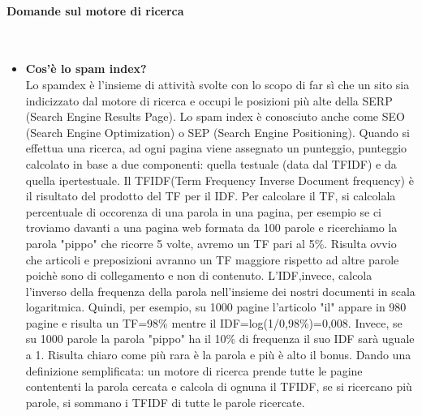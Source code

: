 \documentclass[10pt,                    %
               a4paper,                 %
               twoside,                 %
               openright,               %
               english,                 
               italian,                 
]{article}
\begin{document}
\paragraph{Domande sul motore di ricerca} \mbox{}\\
\begin{itemize}
\item \textbf{Cos'è lo spam index?} \\
Lo spamdex è l'insieme di attività svolte con lo scopo di far sì che un
sito sia indicizzato dal motore di ricerca e occupi le posizioni più alte 
della SERP (Search Engine Results Page).
Lo spam index è conosciuto anche come SEO (Search Engine Optimization) o SEP
(Search Engine Positioning). Quando si effettua una ricerca, ad ogni pagina
viene assegnato un punteggio, punteggio calcolato in base a due componenti: 
quella testuale (data dal TFIDF) e da quella ipertestuale. Il TFIDF(Term 
Frequency Inverse Document frequency) è il risultato del prodotto del TF per 
il IDF. Per calcolare il TF, si calcolala percentuale di occorenza di una 
parola in una pagina, per esempio se ci troviamo davanti a una pagina web 
formata da 100 parole e ricerchiamo la parola "pippo" che ricorre 5 volte, 
avremo un TF pari al 5\%. Risulta ovvio che articoli e preposizioni avranno 
un TF maggiore rispetto ad altre parole poichè sono di collegamento e non di 
contenuto.
L'IDF,invece, calcola l'inverso della frequenza della parola nell'insieme dei
nostri documenti in scala logaritmica. Quindi, per esempio, su 1000 pagine
l'articolo "il" appare in 980 pagine e risulta un TF=98\% mentre il
IDF=log(1/0,98\%)=0,008. Invece, se su 1000 parole la parola "pippo" ha il
10\% di frequenza il suo IDF sarà uguale a 1. Risulta chiaro come più rara è
la parola e più è alto il bonus.
Dando una definizione semplificata: un motore di ricerca prende tutte le 
pagine contententi la parola cercata e calcola di ognuna il TFIDF, se si 
ricercano più parole, si sommano i TFIDF di tutte le parole ricercate. \\


\end{itemize}
\end{document}
